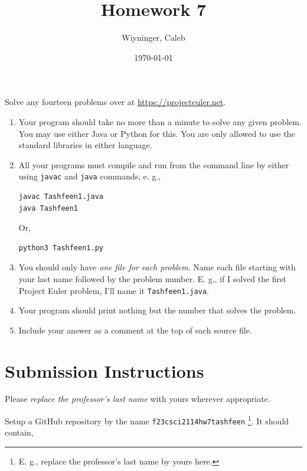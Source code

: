 \documentclass{homework}
\author{Wiyninger, Caleb}
\date{\today}
\title{Homework 7}
\begin{document}
 \maketitle

\question Solve any fourteen problems over at
\url{https://projecteuler.net}.

\begin{enumerate}
  \item Your program should take no more than a minute to solve any given
        problem. You may use either Java or Python for this. You are only
        allowed to use the standard libraries in either language.
  \item All your programs must compile and run from the command line by
        either using \texttt{javac} and \texttt{java} commands, e. g.,
        \begin{verbatim}
javac Tashfeen1.java
java Tashfeen1
\end{verbatim}
        Or,
        \begin{verbatim}
python3 Tashfeen1.py
\end{verbatim}
  \item You should only have \textit{ one file for each problem}. Name
        each file starting with your last name followed by the problem
        number. E. g., if I solved the first Project Euler problem, I'll
        name it \texttt{Tashfeen1.java}.
  \item Your program should print nothing but the number that solves the
        problem.
  \item Include your answer as a comment at the top of each source file.
\end{enumerate}

% 

\section{Submission Instructions}

Please \textit{replace the professor's last name} with yours
wherever appropriate.

Setup a GitHub repository by the name
\texttt{f23csci2114hw7tashfeen} \footnote{E. g., replace the
  professor's last name by yours here.}. It should contain,
\end{document}

